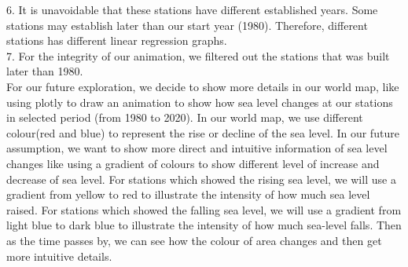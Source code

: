 \documentclass[fontsize=11pt]{article}
\begin{document}
    6. It is unavoidable that these stations have different established years. Some stations may establish later than our start year (1980). Therefore, different stations has different linear regression graphs.\\
    7. For the integrity of our animation, we filtered out the stations that was built later than 1980.\\
    For our future exploration, we decide to show more details in our world map, like using plotly to draw an animation to show how sea level changes at our stations in selected period (from 1980 to 2020). In our world map, we use different colour(red and blue) to represent the rise or decline of the sea level. In our future assumption, we want to show more direct and intuitive information of sea level changes like using a gradient of colours to show different level of increase and decrease of sea level. For stations which showed the rising sea level, we will use a gradient from yellow to red to illustrate the intensity of how much sea level raised. For stations which showed the falling sea level, we will use a gradient from light blue to dark blue to illustrate the intensity of how much sea-level falls. Then as the time passes by, we can see how the colour of area changes and then get more intuitive details.

    \newpage
\end{document}
